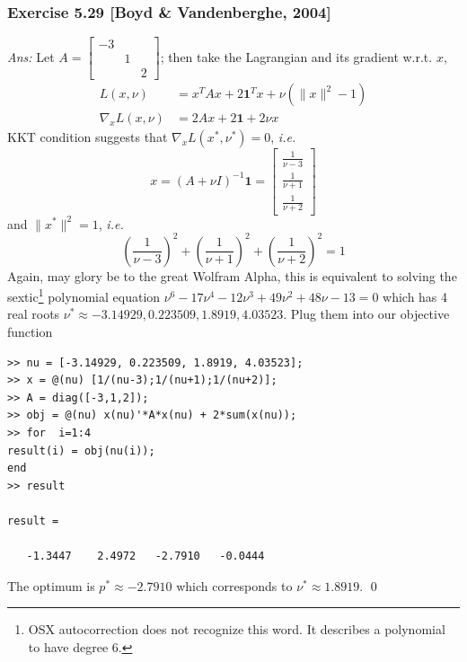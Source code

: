 \documentclass[12pt,a4paper]{article}
\renewcommand{\l}{\left}\renewcommand{\r}{\right}
\newcommand\ie{{\it i.e. }}
\begin{document}
\newpage\subsubsection*{Exercise 5.29 [Boyd \& Vandenberghe, 2004]}
{\it Ans:} Let $A = \l[\begin{array}{ccc}
-3 &&\\
&1&\\
&&2\end{array}\r]$; then take the Lagrangian and its gradient w.r.t. $x$,
\begin{align*}
L(x, \nu) &= x^T A x + 2\mathbf1^T x + \nu(\|x\|^2 - 1) \\
\nabla_xL(x,\nu) &= 2Ax + 2\mathbf1  + 2\nu x
\end{align*}
KKT condition suggests that $\nabla_xL(x^\ast, \nu^\ast) = 0$, \ie
$$x = (A+\nu I)^{-1} \mathbf 1 = \l[\begin{array}{c}
\frac1{\nu-3}\\
\frac1{\nu+1}\\
\frac1{\nu+2}
\end{array}\r]$$
and $\|x^\ast\|^2 = 1$, \ie
$$\l(\frac1{\nu-3}\r)^2 + \l(\frac1{\nu+1}\r)^2+\l(\frac1{\nu+2}\r)^2 = 1$$
Again, may glory be to the great Wolfram Alpha, this is equivalent to solving the sextic\footnote{OSX autocorrection does not recognize this word. It describes a polynomial to have degree 6. } polynomial equation $\nu^6 - 17 \nu^4 - 12 \nu^3 + 49 \nu^2 + 48 \nu -13 = 0$ which has 4 real roots $\nu^\ast \approx -3.14929, 0.223509, 1.8919, 4.03523$. Plug them into our objective function \begin{verbatim}
>> nu = [-3.14929, 0.223509, 1.8919, 4.03523];
>> x = @(nu) [1/(nu-3);1/(nu+1);1/(nu+2)];
>> A = diag([-3,1,2]);
>> obj = @(nu) x(nu)'*A*x(nu) + 2*sum(x(nu));
>> for  i=1:4
result(i) = obj(nu(i));
end
>> result

result =

   -1.3447    2.4972   -2.7910   -0.0444

\end{verbatim}
The optimum is $p^\ast \approx -2.7910$ which corresponds to $\nu^\ast \approx 1.8919$. \qed
\end{document}
